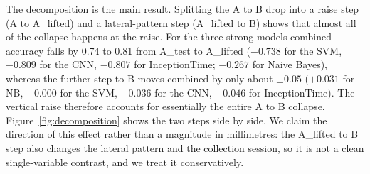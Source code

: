 \documentclass[journal]{IEEEtran}
\let\MYoriglatexcaption\caption
\renewcommand{\caption}[2][\relax]{\MYoriglatexcaption[#2]{#2}}
\begin{document}
\begin{table}[t]
\centering
\setlength{\tabcolsep}{4pt}
\caption{Per-set accuracy (mean $\pm$ 95\% CI over 5 replicates). A\_test is the
held-out in-distribution slice of A, A\_lifted the vertical-raise condition, and B
the out-of-distribution set. Chance is 0.200 for stiffness, 0.167 for texture, and
0.033 for combined.}
\label{tab:ood}
\end{table}

The decomposition is the main result. Splitting the A to B drop into a raise step
(A to A\_lifted) and a lateral-pattern step (A\_lifted to B) shows that almost all
of the collapse happens at the raise. For the three strong models combined accuracy
falls by 0.74 to 0.81 from A\_test to A\_lifted ($-0.738$ for the SVM, $-0.809$ for
the CNN, $-0.807$ for InceptionTime; $-0.267$ for Naive Bayes), whereas the further
step to B moves combined by only about $\pm 0.05$ ($+0.031$ for NB, $-0.000$ for
the SVM, $-0.036$ for the CNN, $-0.046$ for InceptionTime). The vertical raise
therefore accounts for essentially the entire A to B collapse.
Figure~\ref{fig:decomposition} shows the two steps side by side. We claim the
direction of this effect rather than a magnitude in millimetres: the A\_lifted to B
step also changes the lateral pattern and the collection session, so it is not a
clean single-variable contrast, and we treat it conservatively.
\end{document}
